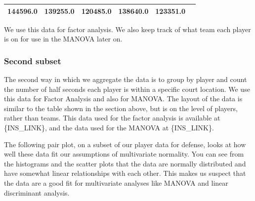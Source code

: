 \documentclass[]{article}
\begin{document}
\begin{longtable}[]{@{}llllll@{}}
\begin{minipage}[t]{0.12\columnwidth}
144596.0\strut
\end{minipage} & \begin{minipage}[t]{0.12\columnwidth}\raggedright
139255.0\strut
\end{minipage} & \begin{minipage}[t]{0.10\columnwidth}\raggedright
120485.0\strut
\end{minipage} & \begin{minipage}[t]{0.12\columnwidth}\raggedright
138640.0\strut
\end{minipage} & \begin{minipage}[t]{0.12\columnwidth}\raggedright
123351.0\strut
\end{minipage}\tabularnewline
\bottomrule
\end{longtable}

We use this data for factor analysis. We also keep track of what team
each player is on for use in the MANOVA later on.

\hypertarget{second-subset}{%
\subsubsection{Second subset}\label{second-subset}}

The second way in which we aggregate the data is to group by player and
count the number of half seconds each player is within a specific court
location. We use this data for Factor Analysis and also for MANOVA. The
layout of the data is similar to the table shown in the section above,
but is on the level of players, rather than teams. This data used for
the factor analysis is available at \{INS\_LINK\}, and the data used for
the MANOVA at \{INS\_LINK\}.

The following pair plot, on a subset of our player data for defense,
looks at how well these data fit our assumptions of multivariate
normality. You can see from the histograms and the scatter plots that
the data are normally distributed and have somewhat linear relationships
with each other. This makes us suspect that the data are a good fit for
multivariate analyses like MANOVA and linear discriminant analysis.
\end{document}
